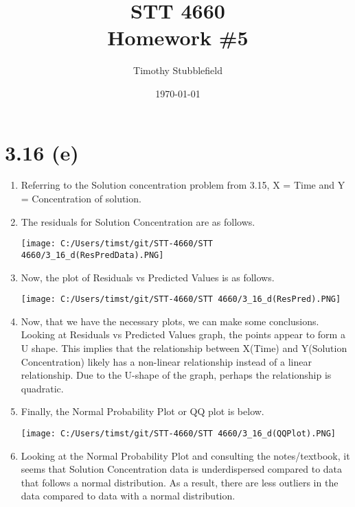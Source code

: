 \documentclass{article}
\title{STT 4660 \\ Homework \#5}
\author{Timothy Stubblefield}
\date{\today}
\begin{document}
	
\maketitle

\section*{3.16 (e)}
	\begin{enumerate}[label = \arabic*)]
		\item Referring to the Solution concentration problem from 3.15, X = Time and Y = Concentration of solution.
		\item The residuals for Solution Concentration are as follows.
		
		\texttt{[image: C:/Users/timst/git/STT-4660/STT 4660/3\_16\_d(ResPredData).PNG]}
		\item Now, the plot of Residuals vs Predicted Values is as follows.
		
		\texttt{[image: C:/Users/timst/git/STT-4660/STT 4660/3\_16\_d(ResPred).PNG]}
		\item Now, that we have the necessary plots, we can make some conclusions.
		Looking at Residuals vs Predicted Values graph, the points appear to form a U shape. This implies that the relationship between X(Time) and Y(Solution Concentration) likely has a non-linear relationship instead of a linear relationship. Due to the U-shape of the graph, perhaps the relationship is quadratic.
		
		\item Finally, the Normal Probability Plot or QQ plot is below.
		
		\texttt{[image: C:/Users/timst/git/STT-4660/STT 4660/3\_16\_d(QQPlot).PNG]}
		\item Looking at the Normal Probability Plot and consulting the notes/textbook, it  seems that Solution Concentration data is underdispersed compared to data that follows a normal distribution. As a result, there are less outliers in the data compared to data with a normal distribution.		
		
	\end{enumerate}
\end{document}
